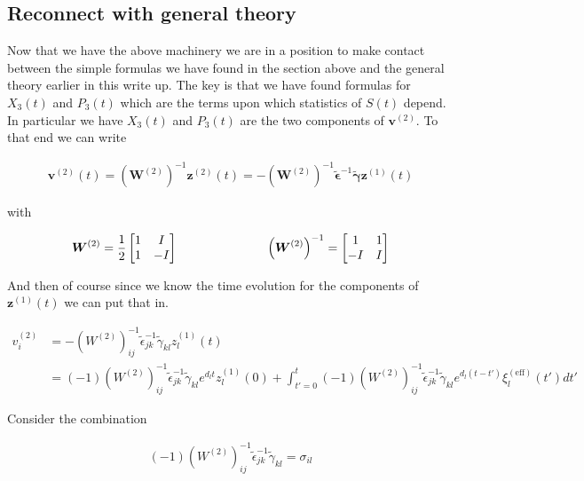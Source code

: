 \documentclass[12pt]{article}
\newcommand{\bv}[1]{\boldsymbol{#1}}
\begin{document}
\subsection{Reconnect with general theory}

Now that we have the above machinery we are in a position to make contact between the simple formulas we have found in the section above and the general theory earlier in this write up. The key is that we have found formulas for $X_3(t)$ and $P_3(t)$ which are the terms upon which statistics of $S(t)$ depend. In particular we have $X_3(t)$ and $P_3(t)$ are the two components of $\bv{v}^{(2)}$. To that end we can write

\begin{align}
\bv{v}^{(2)}(t) = \left(\bv{W}^{(2)}\right)^{-1}\bv{z}^{(2)}(t) = -(\bv{W}^{(2)})^{-1}\tilde{\bv{\epsilon}}^{-1}\tilde{\bv{\gamma}}\bv{z}^{(1)}(t)
\end{align}

with

\begin{align}
\bv{W}^{(2)} = 
\frac{1}{2}\begin{bmatrix}
1 & I\\
1 & -I
\end{bmatrix}
\hspace{1 in}
\left(\bv{W}^{(2)}\right)^{-1} = 
\begin{bmatrix}
1 & 1 \\
-I & I
\end{bmatrix}
\end{align}

And then of course since we know the time evolution for the components of $\bv{z}^{(1)}(t)$ we can put that in.

\begin{align}
v^{(2)}_i &= -\left(W^{(2)}\right)^{-1}_{ij}\tilde{\epsilon}^{-1}_{jk}\tilde{\gamma}_{kl}z^{(1)}_l(t)\\
&= (-1)\left(W^{(2)}\right)^{-1}_{ij}\tilde{\epsilon}^{-1}_{jk}\tilde{\gamma}_{kl} e^{d_l t} z^{(1)}_l(0) + \int_{t'=0}^t (-1)\left(W^{(2)}\right)^{-1}_{ij}\tilde{\epsilon}^{-1}_{jk}\tilde{\gamma}_{kl} e^{d_l(t-t')}\xi^{(\text{eff})}_l(t') dt'
\end{align}

Consider the combination

\begin{align}
(-1)\left(W^{(2)}\right)^{-1}_{ij}\tilde{\epsilon}^{-1}_{jk}\tilde{\gamma}_{kl} = \sigma_{il}
\end{align}
\end{document}
